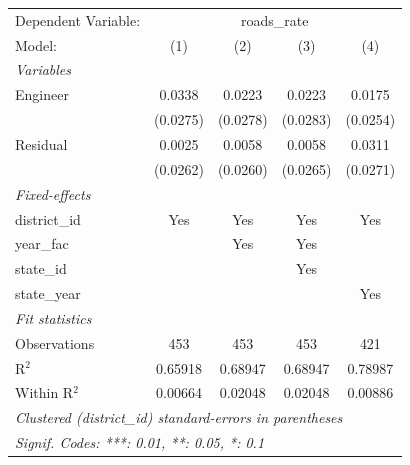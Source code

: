 
\begingroup
\centering
\begin{tabular}{lcccc}
   \tabularnewline \midrule \midrule
   Dependent Variable: & \multicolumn{4}{c}{roads\_rate}\\
   Model:        & (1)      & (2)      & (3)      & (4)\\  
   \midrule
   \emph{Variables}\\
   Engineer      & 0.0338   & 0.0223   & 0.0223   & 0.0175\\   
                 & (0.0275) & (0.0278) & (0.0283) & (0.0254)\\   
   Residual      & 0.0025   & 0.0058   & 0.0058   & 0.0311\\   
                 & (0.0262) & (0.0260) & (0.0265) & (0.0271)\\   
   \midrule
   \emph{Fixed-effects}\\
   district\_id  & Yes      & Yes      & Yes      & Yes\\  
   year\_fac     &          & Yes      & Yes      & \\  
   state\_id     &          &          & Yes      & \\  
   state\_year   &          &          &          & Yes\\  
   \midrule
   \emph{Fit statistics}\\
   Observations  & 453      & 453      & 453      & 421\\  
   R$^2$         & 0.65918  & 0.68947  & 0.68947  & 0.78987\\  
   Within R$^2$  & 0.00664  & 0.02048  & 0.02048  & 0.00886\\  
   \midrule \midrule
   \multicolumn{5}{l}{\emph{Clustered (district\_id) standard-errors in parentheses}}\\
   \multicolumn{5}{l}{\emph{Signif. Codes: ***: 0.01, **: 0.05, *: 0.1}}\\
\end{tabular}
\par\endgroup


